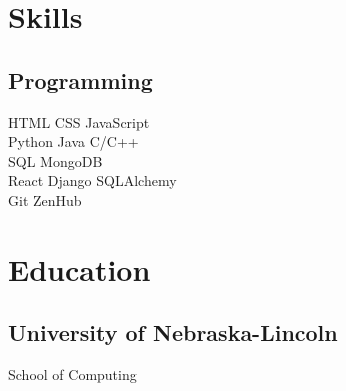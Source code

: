 \documentclass[]{latex/resume}
\begin{document}
\begin{minipage}[t]{0.25\textwidth} 


\section{Skills}
    \subsection{Programming}
                HTML \textbullet{}
                CSS \textbullet{}
                JavaScript\\
        \sectionsep
                Python \textbullet{}
                Java \textbullet{}
                C/C++ \\
        \sectionsep
                SQL \textbullet{}
                MongoDB \\
        \sectionsep
                React \textbullet{}
                Django  \textbullet{}
                SQLAlchemy\\
        \sectionsep
                Git  \textbullet{}
                ZenHub\\
\sectionsep


\section{Education} 
    \subsection{University of Nebraska-Lincoln}
    School of Computing \\




\end{minipage}
\end{document}
